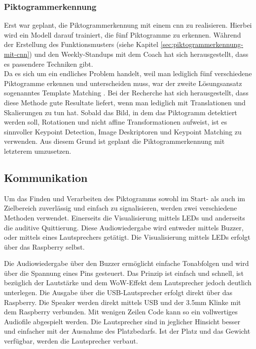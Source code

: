 \subsubsection{Piktogrammerkennung}
\label{piktogrammerkennung}
Erst war geplant, die Piktogrammerkennung mit einem \acrfull{cnn} zu realisieren. Hierbei wird ein Modell darauf trainiert, die fünf Piktogramme zu erkennen. Während der Erstellung des Funktionsmusters (siehe Kapitel \ref{sec:piktogrammerkennung-mit-cnn}) und den Weekly-Standups mit dem Coach hat sich herausgestellt, dass es passendere Techniken gibt.\\
Da es sich um ein endliches Problem handelt, weil man lediglich fünf verschiedene Piktogramme erkennen und unterscheiden muss, war der zweite Lösungsansatz sogenanntes Template Matching \cite{OpenCV-Template-Matching}. Bei der Recherche hat sich herausgestellt, dass diese Methode gute Resultate liefert, wenn man lediglich mit Translationen und Skalierungen zu tun hat. Sobald das Bild, in dem das Piktogramm detektiert werden soll, Rotationen und nicht affine Transformationen aufweist, ist es sinnvoller Keypoint Detection, Image Deskriptoren und Keypoint Matching \cite{OpenCV-Feature-Matching} zu verwenden. Aus diesem Grund ist geplant die Piktogrammerkennung mit letzterem umzusetzen.



\subsection {Kommunikation}
\label{sec:kommunikation}
Um das Finden und Verarbeiten des Piktogramms sowohl im Start- als auch im Zielbereich zuverlässig und einfach zu signalisieren, werden zwei verschiedene Methoden verwendet. Einerseits die Visualisierung mittels LEDs und anderseits die auditive Quittierung. Diese Audiowiedergabe wird entweder mittels Buzzer, oder mittels eines Lautsprechers getätigt. Die Visualisierung mittels LEDs erfolgt über das Raspberry selbst.

Die Audiowiedergabe über den Buzzer ermöglicht einfache Tonabfolgen und wird über die Spannung eines Pins gesteuert. Das Prinzip ist einfach und schnell, ist bezüglich der Lautstärke und dem \glqq WoW-Effekt \grqq{} dem Lautsprecher jedoch deutlich unterlegen.
Die Ausgabe über die USB-Lautsprecher erfolgt direkt über das Raspberry. Die Speaker werden direkt mittels USB und der 3.5mm Klinke mit dem Raspberry verbunden. Mit wenigen Zeilen Code kann so ein vollwertiges Audiofile abgespielt werden.
Die Lautsprecher sind in jeglicher Hinsicht besser und einfacher mit der Ausnahme des Platzbedarfs. Ist der Platz und das Gewicht verfügbar, werden die Lautsprecher verbaut.

